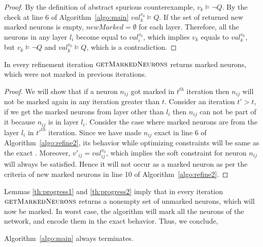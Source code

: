 \begin{proof}
By the definition of abstract spurious counterexample, ${v_k} \models \lnot Q$. 
By the check at line 6 of Algorithm~\ref{algo:main} ${val_k^{{v_0}}} \models Q$. 
If the set of returned new marked neurons is empty, $newMarked = \emptyset$ for each layer. 
Therefore, all the neurons in any layer $l_i$ become equal to ${val_i^{{v_0}}}$,  
which implies ${v_k}$ equals to ${val_k^{{v_0}}}$, but ${v_k} \models \lnot Q$ and 
${val_k^{{v_0}}} \models Q$, which is a contradiction.   
\end{proof}


\begin{lemma}
  \label{th:progress2}
  In every refinement iteration $\textsc{getMarkedNeurons}$
  returns marked neurons, which were not marked in previous iterations. 
\end{lemma}

\begin{proof}
We will show that if a neuron $n_{ij}$ got marked in $t^{th}$ iteration then $n_{ij}$ will not be marked again in any iteration greater than $t$.
Consider an iteration $t' > t$, if we get the marked neurons from layer other
than $l_i$ then $n_{ij}$ can not be part of it because $n_{ij}$ is in layer $l_i$. 
Consider the case where marked neurons are from the layer $l_i$ in $t'^{th}$ iteration. 
Since we have made $n_{ij}$ exact in line 6 of Algorithm~\ref{algo:refine2},
its behavior while optimizing constraints will be same as the exact \relu{}. 
Moreover, $v'_{ij} = val_{ij}^{v_0}$, 
which implies the soft constraint for neuron $n_{ij}$ will always be satisfied. Hence it will not occur as a marked neuron as per the criteria of new marked neurons in line 10 of Algorithm~\ref{algo:refine2}.   %
\end{proof}


Lemmas \ref{th:progress1} and \ref{th:progress2} imply that in every iteration $\textsc{getMarkedNeurons}$ returns a nonempty set of unmarked neurons, which will now be marked. In worst case, the algorithm will mark all the neurons of the network, and encode them in the exact behavior. Thus, we conclude,

\begin{theorem}
  Algorithm~\ref{algo:main} always terminates.
\end{theorem}


